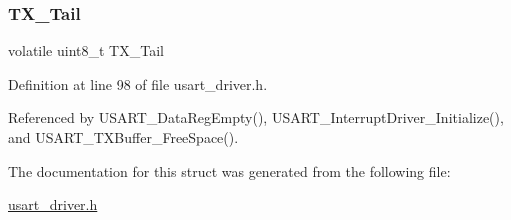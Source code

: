 \subsubsection{\texorpdfstring{T\+X\+\_\+\+Tail}{TX\_Tail}}
{\footnotesize\ttfamily volatile uint8\+\_\+t T\+X\+\_\+\+Tail}



Definition at line 98 of file usart\+\_\+driver.\+h.



Referenced by U\+S\+A\+R\+T\+\_\+\+Data\+Reg\+Empty(), U\+S\+A\+R\+T\+\_\+\+Interrupt\+Driver\+\_\+\+Initialize(), and U\+S\+A\+R\+T\+\_\+\+T\+X\+Buffer\+\_\+\+Free\+Space().



The documentation for this struct was generated from the following file\+:\begin{DoxyCompactItemize}
\item 
\hyperlink{usart__driver_8h}{usart\+\_\+driver.\+h}\end{DoxyCompactItemize}
